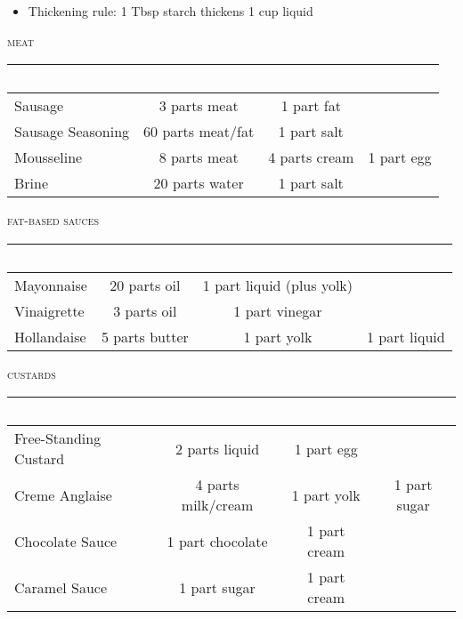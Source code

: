 \documentclass[letterpaper,11pt]{article}
\newcommand{\sectionheader}[1]{
    \vspace{1.2em}
    {\small\textsc{#1}} \\
}
\begin{document}
\begin{itemize}
  \item Thickening rule: 1 Tbsp starch thickens 1 cup liquid
\end{itemize}

\sectionheader{meat}
\begin{tabular}{ l c c c }
\rowcolor{white}
~ \\
\hline
Sausage & 3 parts meat & 1 part fat & \\
Sausage Seasoning & 60 parts meat/fat & 1 part salt \\
Mousseline & 8 parts meat & 4 parts cream & 1 part egg \\
Brine & 20 parts water & 1 part salt & \\
\end{tabular}

\sectionheader{fat-based sauces}
\begin{tabular}{ l c c c }
\rowcolor{white}
~ \\
\hline
Mayonnaise & 20 parts oil & 1 part liquid (plus yolk) & \\
Vinaigrette & 3 parts oil & 1 part vinegar & \\
Hollandaise & 5 parts butter & 1 part yolk & 1 part liquid \\
\end{tabular}

\sectionheader{custards}
\begin{tabular}{ l c c c }
\rowcolor{white}
~ \\
\hline
Free-Standing Custard & 2 parts liquid & 1 part egg & \\
Creme Anglaise & 4 parts milk/cream & 1 part yolk & 1 part sugar \\
Chocolate Sauce & 1 part chocolate & 1 part cream & \\
Caramel Sauce & 1 part sugar & 1 part cream & \\
\end{tabular}
\end{document}
